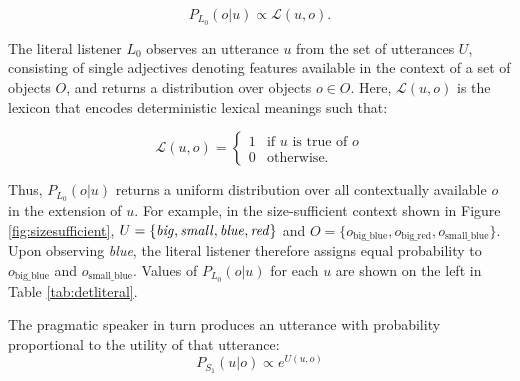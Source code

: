 \documentclass[11pt]{article}
\newcommand{\denote}[1]{\mbox{ $[\![ #1 ]\!]$}}
\newcommand{\tableref}[1]{Table \ref{#1}}
\newcommand{\figref}[1]{Figure \ref{#1}}
\begin{document}
\begin{equation}
\label{eq:listener}
P_{L_0}(o | u) \propto \mathcal{L}(u,o).
\end{equation}


The literal listener $L_0$ observes an utterance $u$ from the set of  utterances $U$, consisting of single adjectives denoting features available in the context of a set of objects  $O$, and returns a distribution over objects $o \in O$. Here, $\mathcal{L}(u,o)$ is the lexicon that encodes deterministic lexical meanings such that: 

\begin{equation}
\mathcal{L}(u,o) = \left\{
 \begin{array}{rl}
  1 & \text{if } u \text{ is true of } o\\
   0 & \text{otherwise}.
 \end{array} \right.
\end{equation}

 Thus, $P_{L_0}(o | u)$ returns a uniform distribution over all contextually available $o$ in the extension of $u$. For example, in the size-sufficient context shown in \figref{fig:sizesufficient}, $U = \{\textrm{\emph{big}}, \textrm{\emph{small}}, \textrm{\emph{blue}}, \textrm{\emph{red}}\}$ and $O = \{o_{\textrm{big\_blue}}, o_{\textrm{big\_red}}, o_{\textrm{small\_blue}}\}$. Upon observing \emph{blue}, the literal listener therefore assigns equal probability to  $o_{\textrm{big\_blue}}$ and $o_{\textrm{small\_blue}}$. Values of $P_{L_0}(o | u)$ for each $u$ are shown on the left in \tableref{tab:detliteral}.

The pragmatic speaker in turn produces an utterance with probability proportional to the utility of that utterance:
\begin{equation}
P_{S_1}(u | o) \propto e^{U(u,o)}
\end{equation}
\end{document}
